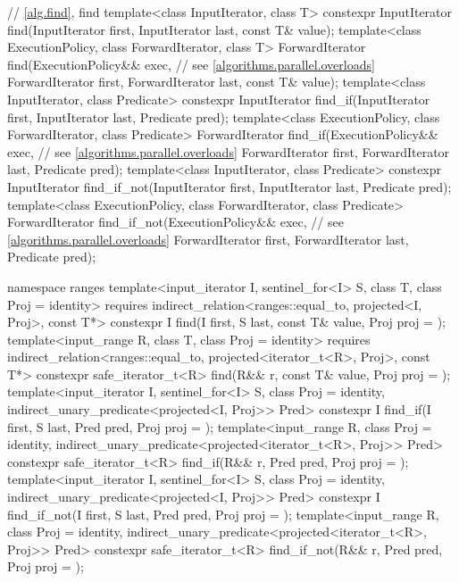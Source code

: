 \begin{codeblock}
{  // \ref{alg.find}, find
  template<class InputIterator, class T>
    constexpr InputIterator find(InputIterator first, InputIterator last,
                                 const T& value);
  template<class ExecutionPolicy, class ForwardIterator, class T>
    ForwardIterator find(ExecutionPolicy&& exec,                // see \ref{algorithms.parallel.overloads}
                         ForwardIterator first, ForwardIterator last,
                         const T& value);
  template<class InputIterator, class Predicate>
    constexpr InputIterator find_if(InputIterator first, InputIterator last,
                                    Predicate pred);
  template<class ExecutionPolicy, class ForwardIterator, class Predicate>
    ForwardIterator find_if(ExecutionPolicy&& exec,             // see \ref{algorithms.parallel.overloads}
                            ForwardIterator first, ForwardIterator last,
                            Predicate pred);
  template<class InputIterator, class Predicate>
    constexpr InputIterator find_if_not(InputIterator first, InputIterator last,
                                        Predicate pred);
  template<class ExecutionPolicy, class ForwardIterator, class Predicate>
    ForwardIterator find_if_not(ExecutionPolicy&& exec,         // see \ref{algorithms.parallel.overloads}
                                ForwardIterator first, ForwardIterator last,
                                Predicate pred);

  namespace ranges {
    template<input_iterator I, sentinel_for<I> S, class T, class Proj = identity>
      requires indirect_relation<ranges::equal_to, projected<I, Proj>, const T*>
      constexpr I find(I first, S last, const T& value, Proj proj = {});
    template<input_range R, class T, class Proj = identity>
      requires indirect_relation<ranges::equal_to, projected<iterator_t<R>, Proj>, const T*>
      constexpr safe_iterator_t<R>
        find(R&& r, const T& value, Proj proj = {});
    template<input_iterator I, sentinel_for<I> S, class Proj = identity,
             indirect_unary_predicate<projected<I, Proj>> Pred>
      constexpr I find_if(I first, S last, Pred pred, Proj proj = {});
    template<input_range R, class Proj = identity,
             indirect_unary_predicate<projected<iterator_t<R>, Proj>> Pred>
      constexpr safe_iterator_t<R>
        find_if(R&& r, Pred pred, Proj proj = {});
    template<input_iterator I, sentinel_for<I> S, class Proj = identity,
             indirect_unary_predicate<projected<I, Proj>> Pred>
      constexpr I find_if_not(I first, S last, Pred pred, Proj proj = {});
    template<input_range R, class Proj = identity,
             indirect_unary_predicate<projected<iterator_t<R>, Proj>> Pred>
      constexpr safe_iterator_t<R>
        find_if_not(R&& r, Pred pred, Proj proj = {});
  }

}
\end{codeblock}
